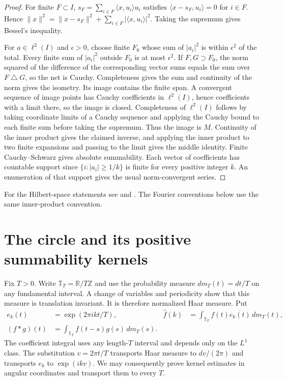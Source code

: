 \documentclass[11pt,oneside,openany]{book}
\theoremstyle{definition}
\theoremstyle{remark}
\begin{document}
\begin{proof}
For finite $F\subset I$, $s_F=\sum_{i\in F}\langle x,u_i\rangle u_i$
satisfies $\langle x-s_F,u_i\rangle=0$ for $i\in F$. Hence
$\|x\|^2=\|x-s_F\|^2+\sum_{i\in F}|\langle x,u_i\rangle|^2$.
Taking the supremum gives Bessel's inequality.

For $a\in\ell^2(I)$ and $\epsilon>0$, choose finite $F_0$ whose sum of
$|a_i|^2$ is within $\epsilon^2$ of the total. Every finite sum of
$|a_i|^2$ outside $F_0$ is at most $\epsilon^2$. If $F,G\supset F_0$, the
norm squared of the difference of the corresponding vector sums equals
the sum over $F\mathbin{\triangle} G$, so the net is Cauchy. Completeness
gives the sum and continuity of the norm gives the isometry. Its image
contains the finite span. A convergent sequence of image points has
Cauchy coefficients in $\ell^2(I)$, hence coefficients with a limit there,
so the image is closed. Completeness of $\ell^2(I)$ follows by taking coordinate
limits of a Cauchy sequence and applying the Cauchy bound to each finite
sum before taking the supremum. Thus the image is $M$. Continuity of the
inner product gives the claimed inverse, and applying the inner product
to two finite expansions and passing to the limit gives the middle
identity. Finite Cauchy--Schwarz gives absolute summability. Each vector
of coefficients has countable support since
$\{i:|a_i|\ge 1/k\}$ is finite for every positive integer $k$. An
enumeration of that support gives the usual norm-convergent series.
\end{proof}

For the Hilbert-space statements see \cite[Section~5.5, Theorem~5.27 and
Proposition~5.30]{folland} and \cite[Sections~11.2--11.6]{apostol}.
The Fourier conventions below use the same inner-product convention.

\section{The circle and its positive summability kernels}

Fix $T>0$. Write $\mathbb T_T=\mathbb R/T\mathbb Z$ and use the probability
measure $dm_T(t)=dt/T$ on any fundamental interval. A change of variables
and periodicity show that this measure is translation invariant. It is
therefore normalized Haar measure. Put
\begin{align*}
 e_k(t)&=\exp(2\pi i k t/T),&
 \widehat f(k)&=\int_{\mathbb T_T} f(t)\overline{e_k(t)}\,dm_T(t),\\
 (f*g)(t)&=\int_{\mathbb T_T} f(t-s)g(s)\,dm_T(s).
\end{align*}
The coefficient integral uses any length-$T$ interval and depends only
on the $L^1$ class. The substitution $v=2\pi t/T$ transports Haar measure
to $dv/(2\pi)$ and transports $e_k$ to $\exp(ikv)$. We may consequently
prove kernel estimates in angular coordinates and transport them to
every $T$.
\end{document}
